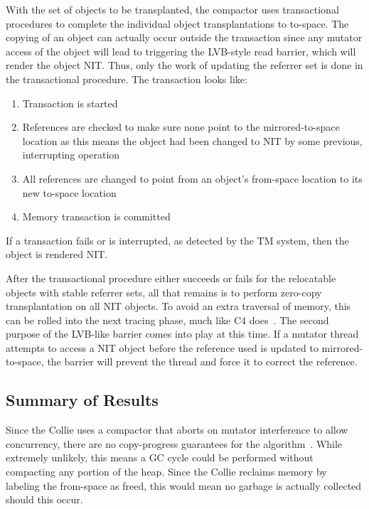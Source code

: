 \documentclass{sig-alternate}
\begin{document}
With the set of objects to be transplanted, the compactor uses transactional
procedures to complete the individual object transplantations to to-space.
The copying of an object can actually occur outside the transaction since any
mutator access of the object will lead to triggering the LVB-style read barrier,
which will render the object NIT. Thus, only the work of updating the referrer set
is done in the transactional procedure. The transaction looks like:
\begin{enumerate}
\item Transaction is started
\item References are checked to make sure none point to the mirrored-to-space location as this means the object had been changed to NIT by some previous, interrupting operation
\item All references are changed to point from an object's from-space location to its new to-space location
\item Memory transaction is committed
\end{enumerate}
If a transaction fails or is interrupted, as detected by the TM system, then the object is rendered NIT.

After the transactional procedure either succeeds or fails for the 
relocatable objects with stable referrer sets, all that remains is to perform zero-copy transplantation
on all NIT objects. To avoid an extra traversal of memory, this can be rolled into the next tracing
phase, much like C4 does~\cite{Tene:C4}. The second purpose of the LVB-like barrier comes into play
at this time. If a mutator thread attempts to access a NIT object before the 
reference used is updated to mirrored-to-space, the barrier will prevent the thread and force it to 
correct the reference.


\subsection{Summary of Results}
\label{sec:collieResults}

Since the Collie uses a compactor that aborts on mutator interference to allow
concurrency, there are no copy-progress guarantees for the algorithm~\cite{Osterlund:FPP}.
While extremely unlikely, this means a GC cycle could be performed without compacting
any portion of the heap. Since the Collie reclaims memory by labeling the from-space as freed,
this would mean no garbage is actually collected should this occur.
\end{document}
